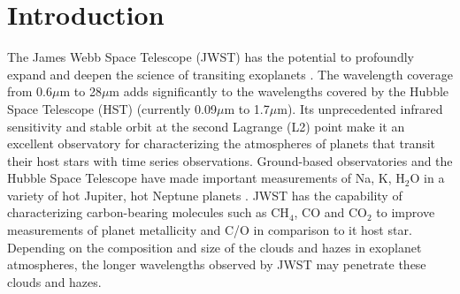 \documentclass[iop]{emulateapj}
\begin{document}

\section{Introduction}

The James Webb Space Telescope (JWST) \citep[e.g.][]{gardner2006SSRv} has the potential to profoundly expand and deepen the science of transiting exoplanets \citep[e.g.][]{greene2016jwst_trans}.
The wavelength coverage from 0.6$\mu$m to 28$\mu$m adds significantly to the wavelengths covered by the Hubble Space Telescope (HST) (currently 0.09$\mu$m to 1.7$\mu$m).
Its unprecedented infrared sensitivity and stable orbit at the second Lagrange (L2) point make it an excellent observatory for characterizing the atmospheres of planets that transit their host stars with time series observations.
Ground-based observatories and the Hubble Space Telescope have made important measurements of Na, K, H$_2$O in a variety of hot Jupiter, hot Neptune planets \cite[e.g.][]{snellen2008Na209,kreidberg2014wasp43,fraine2014hatp11,deming13,sing2016continuum}.
JWST has the capability of characterizing carbon-bearing molecules such as CH$_4$, CO and CO$_2$ to improve measurements of planet metallicity and C/O in comparison to it host star.
Depending on the composition and size of the clouds and hazes in exoplanet atmospheres, the longer wavelengths observed by JWST may penetrate these clouds and hazes.
\end{document}
